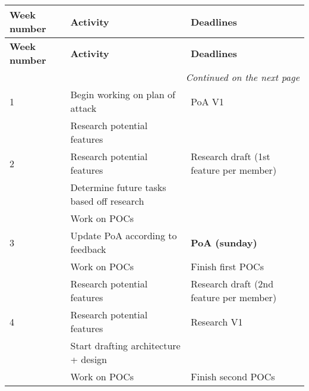 \documentclass{article} %
\begin{document}
\begin{longtable}{|l|p{}|p{}|}
    \hline
    \textbf{Week number} & \textbf{Activity}                         & \textbf{Deadlines}                      \\ \hline
    \endfirsthead

    \hline
    \textbf{Week number} & \textbf{Activity}                         & \textbf{Deadlines}                      \\ \hline
    \endhead

    \hline \multicolumn{3}{r}{\textit{Continued on the next page}}                                             \\ \hline
    \endfoot

    \hline
    \endlastfoot

    1                    & Begin working on plan of attack           & PoA V1                                  \\ \hline
                         & Research potential features               &                                         \\ \hline
    2                    & Research potential features               & Research draft (1st feature per member) \\ \hline
                         & Determine future tasks based off research &                                         \\ \hline
                         & Work on POCs                              &                                         \\ \hline
    3                    & Update PoA according to feedback          & \textbf{PoA (sunday)}                   \\ \hline
                         & Work on POCs                              & Finish first POCs                       \\ \hline
                         & Research potential features               & Research draft (2nd feature per member) \\ \hline
    4                    & Research potential features               & Research V1                             \\ \hline
                         & Start drafting architecture + design      &                                         \\ \hline
                         & Work on POCs                              & Finish second POCs                      \\ \hline

\end{longtable}
\end{document}
